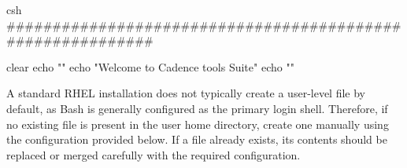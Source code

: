 \begin{codeblock}{csh}
###########################################################

clear
echo ""
echo "Welcome to Cadence tools Suite"
echo ""

\end{codeblock}
\vspace{0.5in}

A standard RHEL installation does not typically create a user-level  file by default, as Bash is generally configured as the primary login shell. Therefore, if no existing  file is present in the user home directory, create one manually using the configuration provided below. If a  file already exists, its contents should be replaced or merged carefully with the required configuration.
